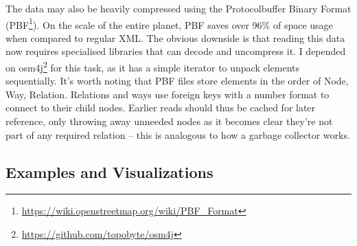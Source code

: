 The data may also be heavily compressed using the Protocolbuffer Binary Format (PBF\footnote{\url{https://wiki.openstreetmap.org/wiki/PBF_Format}}). On the scale of the entire planet, PBF saves over 96\% of space usage when compared to regular XML. The obvious downside is that reading this data now requires specialised libraries that can decode and uncompress it. I depended on osm4j\footnote{\url{https://github.com/topobyte/osm4j}} for this task, as it has a simple iterator to unpack elements sequentially. It's worth noting that PBF files store elements in the order of Node, Way, Relation. Relations and ways use foreign keys with a number format to connect to their child nodes. Earlier reads should thus be cached for later reference, only throwing away unneeded nodes as it becomes clear they're not part of any required relation -- this is analogous to how a garbage collector works.

\subsection{Examples and Visualizations}
